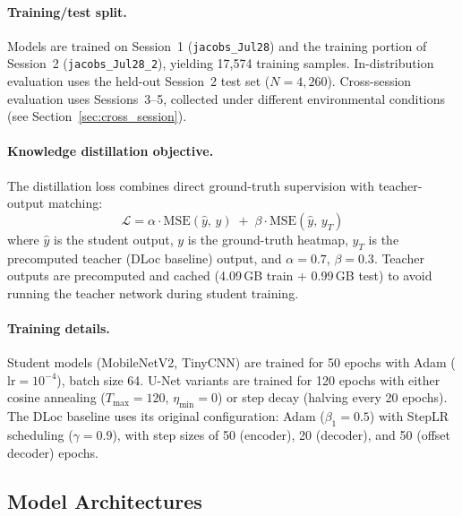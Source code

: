\documentclass[11pt,a4paper]{article}
\begin{document}
\paragraph{Training/test split.}
Models are trained on Session~1 (\texttt{jacobs\_Jul28}) and the training portion of Session~2 (\texttt{jacobs\_Jul28\_2}), yielding 17{,}574 training samples.
In-distribution evaluation uses the held-out Session~2 test set ($N = 4{,}260$).
Cross-session evaluation uses Sessions~3--5, collected under different environmental conditions (see Section~\ref{sec:cross_session}).

\paragraph{Knowledge distillation objective.}
The distillation loss combines direct ground-truth supervision with teacher-output matching:
\begin{equation}
  \mathcal{L} = \alpha \cdot \text{MSE}(\hat{y},\, y) \;+\; \beta \cdot \text{MSE}(\hat{y},\, y_T)
  \label{eq:distill}
\end{equation}
where $\hat{y}$ is the student output, $y$ is the ground-truth heatmap, $y_T$ is the precomputed teacher (DLoc baseline) output, and $\alpha = 0.7$, $\beta = 0.3$.
Teacher outputs are precomputed and cached (4.09\,GB train + 0.99\,GB test) to avoid running the teacher network during student training.

\paragraph{Training details.}
Student models (MobileNetV2, TinyCNN) are trained for 50 epochs with Adam ($\text{lr} = 10^{-4}$), batch size 64.
U-Net variants are trained for 120 epochs with either cosine annealing ($T_{\max} = 120$, $\eta_{\min} = 0$) or step decay (halving every 20 epochs).
The DLoc baseline uses its original configuration: Adam ($\beta_1 = 0.5$) with StepLR scheduling ($\gamma = 0.9$), with step sizes of 50 (encoder), 20 (decoder), and 50 (offset decoder) epochs.

\subsection{Model Architectures}
\end{document}
